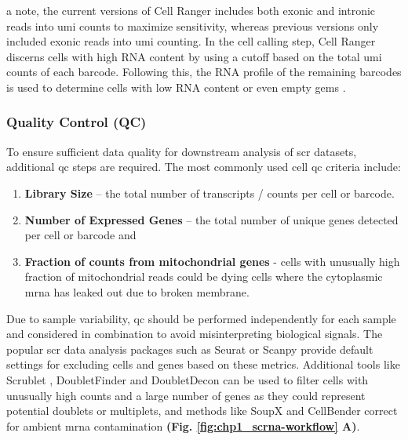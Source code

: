 a note, the current versions of Cell Ranger includes both exonic and intronic reads into \gls{umi} counts to maximize sensitivity, whereas previous versions only included exonic reads into \gls{umi} counting. In the cell calling step, Cell Ranger discerns cells with high RNA content by using a cutoff based on the total \gls{umi} counts of each barcode. Following this, the RNA profile of the remaining barcodes is used to determine cells with low RNA content or even empty \gls{gem}s \textbf{\cite{noauthor_cell_nodate}}.


\subsubsection{Quality Control (QC)}

\par To ensure sufficient data quality for downstream analysis of \gls{scr} datasets, additional \gls{qc} steps are required. The most commonly used cell \gls{qc} criteria include:
\begin{enumerate}
    \item \textbf{Library Size} – the total number of transcripts / counts per cell or barcode.
    \item \textbf{Number of Expressed Genes} – the total number of unique genes detected per cell or barcode and
    \item \textbf{Fraction of counts from mitochondrial genes } - cells with unusually high fraction of mitochondrial reads could be dying cells where the cytoplasmic \gls{mrna} has leaked out due to broken membrane.
\end{enumerate}
\par Due to sample variability, \gls{qc} should be performed independently for each sample and considered in combination to avoid misinterpreting biological signals. The popular \gls{scr} data analysis packages such as Seurat \textbf{\cite{butler_integrating_2018,stuart_comprehensive_2019,hao_integrated_2021}} or Scanpy \textbf{\cite{wolf_scanpy_2018}} provide default settings for excluding cells and genes based on these metrics. Additional tools like Scrublet \textbf{\cite{wolock_scrublet_2019}}, DoubletFinder \textbf{\cite{mcginnis_doubletfinder_2019}} and DoubletDecon \textbf{\cite{depasquale_doubletdecon:_2019}} can be used to filter cells with unusually high counts and a large number of genes as they could represent potential doublets or multiplets, and methods like SoupX \textbf{\cite{young_soupx_2020}} and CellBender \textbf{\cite{fleming_unsupervised_2023}} correct for ambient \gls{mrna} contamination \textbf{(Fig. \ref{fig:chp1_scrna-workflow} A)}.

